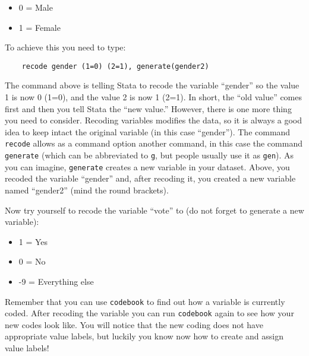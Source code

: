 \begin{itemize}
	\item 0 = Male
	\item 1 = Female
\end{itemize}

To achieve this you need to type:

\begin{lstlisting}
	recode gender (1=0) (2=1), generate(gender2) 
\end{lstlisting}

The command above is telling Stata to recode the variable ``gender'' so the value 1 is now 0 (1=0), and the value 2 is now 1 (2=1). In short, the ``old value'' comes first and then you tell Stata the ``new value.'' However, there is one more thing you need to consider. Recoding variables modifies the data, so it is always a good idea to keep intact the original variable (in this case ``gender''). The command \texttt{recode} allows as a command option another command, in this case the command \texttt{generate} (which can be abbreviated to \texttt{g}, but people usually use it as \texttt{gen}). As you can imagine, \texttt{generate} creates a new variable in your dataset. Above, you recoded the variable ``gender'' and, after recoding it, you created a new variable named ``gender2'' (mind the round brackets).

Now try yourself to recode the variable ``vote'' to (do not forget to generate a new variable):

\begin{itemize}
	\item 1 = Yes
	\item 0 = No
	\item -9 = Everything else
\end{itemize}

Remember that you can use \texttt{codebook} to find out how a variable is currently coded. After recoding the variable you can run \texttt{codebook} again to see how your new codes look like. You will notice that the new coding does not have appropriate value labels, but luckily you know now how to create and assign value labels!
